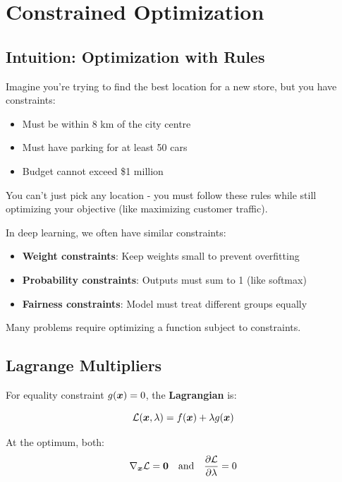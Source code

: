 
\section{Constrained Optimization }
\label{sec:constrained-optimization}

\subsection{Intuition: Optimization with Rules}

Imagine you're trying to find the best location for a new store, but you have constraints:
\begin{itemize}
    \item Must be within 8 km of the city centre
    \item Must have parking for at least 50 cars
    \item Budget cannot exceed \$1 million
\end{itemize}

You can't just pick any location - you must follow these rules while still optimizing your objective (like maximizing customer traffic).

In deep learning, we often have similar constraints:
\begin{itemize}
    \item \textbf{Weight constraints}: Keep weights small to prevent overfitting
    \item \textbf{Probability constraints}: Outputs must sum to 1 (like softmax)
    \item \textbf{Fairness constraints}: Model must treat different groups equally
\end{itemize}

Many problems require optimizing a function subject to constraints.

\subsection{Lagrange Multipliers}

For equality constraint $g(\boldsymbol{x}) = 0$, the \textbf{Lagrangian} is:

\begin{equation}
\mathcal{L}(\boldsymbol{x}, \lambda) = f(\boldsymbol{x}) + \lambda g(\boldsymbol{x})
\end{equation}

At the optimum, both:
\begin{equation}
\nabla_{\boldsymbol{x}} \mathcal{L} = \boldsymbol{0} \quad \text{and} \quad \frac{\partial \mathcal{L}}{\partial \lambda} = 0
\end{equation}

